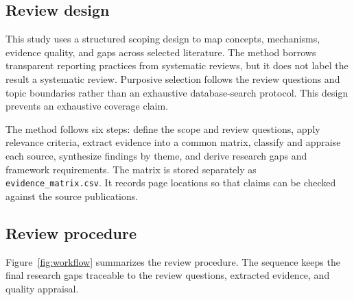 \documentclass[11pt,a4paper]{article}
\begin{document}
\subsection{Review design}

This study uses a structured scoping design to map concepts, mechanisms, evidence quality, and gaps across selected literature. The method borrows transparent reporting practices from systematic reviews, but it does not label the result a systematic review. Purposive selection follows the review questions and topic boundaries rather than an exhaustive database-search protocol. This design prevents an exhaustive coverage claim.

The method follows six steps: define the scope and review questions, apply relevance criteria, extract evidence into a common matrix, classify and appraise each source, synthesize findings by theme, and derive research gaps and framework requirements. The matrix is stored separately as \texttt{evidence\_matrix.csv}. It records page locations so that claims can be checked against the source publications.

\subsection{Review procedure}

Figure~\ref{fig:workflow} summarizes the review procedure. The sequence keeps the final research gaps traceable to the review questions, extracted evidence, and quality appraisal.
\end{document}
